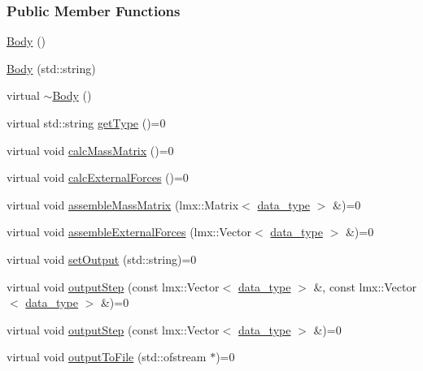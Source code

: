\subsubsection*{Public Member Functions}
\begin{DoxyCompactItemize}
\item 
\hyperlink{classmknix_1_1_body_a5f11ba30f14169c567d8e3f84afbbf40}{Body} ()
\item 
\hyperlink{classmknix_1_1_body_a121c49df553ac35ca246052168eccb7f}{Body} (std\-::string)
\item 
virtual \hyperlink{classmknix_1_1_body_ad58a0a50a821e1adaa5abd1320e5a837}{$\sim$\-Body} ()
\item 
virtual std\-::string \hyperlink{classmknix_1_1_body_a603ed0a11eee91957b2655a0e4667cd4}{get\-Type} ()=0
\item 
virtual void \hyperlink{classmknix_1_1_body_ad34fa07c6620c9fcc2268bfdbfd42194}{calc\-Mass\-Matrix} ()=0
\item 
virtual void \hyperlink{classmknix_1_1_body_a71d21e817523058098bcec62fb377187}{calc\-External\-Forces} ()=0
\item 
virtual void \hyperlink{classmknix_1_1_body_acd6c47f4e0a25e927141cb325df896a9}{assemble\-Mass\-Matrix} (lmx\-::\-Matrix$<$ \hyperlink{namespacemknix_a16be4b246fbf2cceb141e3a179111020}{data\-\_\-type} $>$ \&)=0
\item 
virtual void \hyperlink{classmknix_1_1_body_a46a17ef341d6ea217e1548108a4e9efc}{assemble\-External\-Forces} (lmx\-::\-Vector$<$ \hyperlink{namespacemknix_a16be4b246fbf2cceb141e3a179111020}{data\-\_\-type} $>$ \&)=0
\item 
virtual void \hyperlink{classmknix_1_1_body_a689970a0729d557ed56492bbfeae4ecd}{set\-Output} (std\-::string)=0
\item 
virtual void \hyperlink{classmknix_1_1_body_a2655307ec61a79f8d2e5716c984a44df}{output\-Step} (const lmx\-::\-Vector$<$ \hyperlink{namespacemknix_a16be4b246fbf2cceb141e3a179111020}{data\-\_\-type} $>$ \&, const lmx\-::\-Vector$<$ \hyperlink{namespacemknix_a16be4b246fbf2cceb141e3a179111020}{data\-\_\-type} $>$ \&)=0
\item 
virtual void \hyperlink{classmknix_1_1_body_a0570075194360f453b763866969548e7}{output\-Step} (const lmx\-::\-Vector$<$ \hyperlink{namespacemknix_a16be4b246fbf2cceb141e3a179111020}{data\-\_\-type} $>$ \&)=0
\item 
virtual void \hyperlink{classmknix_1_1_body_acc0dd60d384ec11bf1ea71fed9ae27b3}{output\-To\-File} (std\-::ofstream $\ast$)=0
\item 

\end{DoxyCompactItemize}
